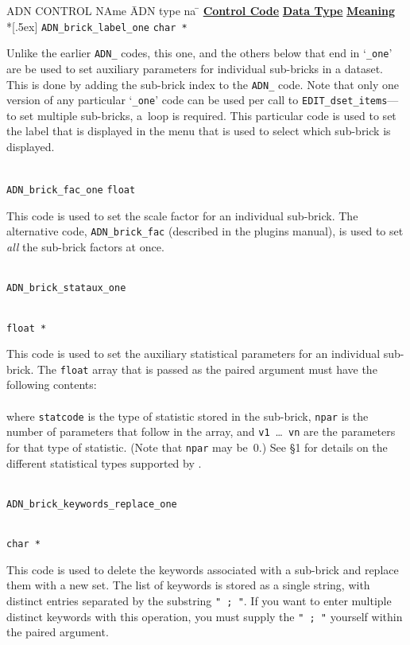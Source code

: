 \vset
\newcommand{\tb}[1]{\parbox[t]{3.6in}{\sloppy #1}}
\begin{tabbing}
  ADN CONTROL NAme \= ADN type na \= \kill
%
\underline{\bf Control Code} \> \underline{\bf Data Type} \> \underline{\bf Meaning} \\*[.5ex]
%
{\tt ADN\_brick\_label\_one}            \> {\tt char *} \>
         \tb{Unlike the earlier {\tt ADN\_} codes, this one, and the
             others below that end in `{\tt \_one}' are be used to
             set auxiliary parameters for individual sub-bricks in
             a dataset.  This is done by adding the sub-brick index
             to the {\tt ADN\_} code. Note that only one version
             of any particular `{\tt \_one}' code can be used per
             call to {\tt EDIT\_dset\_items}---to set multiple sub-bricks,
             a~loop is required.  This particular code is used
             to set the label that is displayed in the menu that
             is used to select which sub-brick is displayed.}
\\[.9ex]

{\tt ADN\_brick\_fac\_one}              \> {\tt float}  \>
          \tb{This code is used to set the scale factor for an
              individual sub-brick.  The alternative code,
              {\tt ADN\_brick\_fac} (described in the plugins manual),
              is used to set {\it all\/} the sub-brick factors at once.}
\\[.9ex]

{\tt ADN\_brick\_stataux\_one}          \> \tb{\blob\\[.5ex]{\tt float *}} \>
          \tb{This code is used to set the auxiliary statistical
              parameters for an individual sub-brick.  The {\tt float}
              array that is passed as the paired argument must have
              the following contents:\\
              \blob\blob {\tt statcode npar v1 v2 ... vn}\\
              where {\tt statcode} is the type of statistic
              stored in the sub-brick, {\tt npar} is the number
              of parameters that follow in the array,
              and {\tt v1}~\ldots~{\tt vn} are the parameters
              for that type of statistic.  (Note that {\tt npar} may
              be~0.)  See \S1 for details on the
              different statistical types supported by \afni.}
\\[.9ex]

{\tt ADN\_brick\_keywords\_replace\_one} \> \tb{\blob\\[.5ex]{\tt char *}} \>
          \tb{This code is used to delete the keywords associated
              with a sub-brick and replace them with a new set.
              The list of keywords is stored as a single string,
              with distinct entries separated by the substring
              \hbox{\tt " ; "}.  If you want to enter multiple distinct
              keywords with this operation, you must supply the
              \hbox{\tt " ; "} yourself within the paired argument.}
\\[.9ex]


\end{tabbing}
